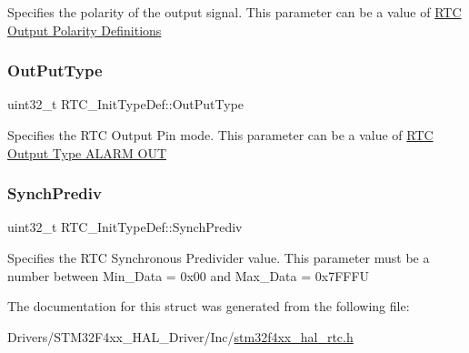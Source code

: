 Specifies the polarity of the output signal. This parameter can be a value of \hyperlink{group___r_t_c___output___polarity___definitions}{R\+TC Output Polarity Definitions} \mbox{\label{struct_r_t_c___init_type_def_a2c4a2bd3cfae39882e657e653e45185a}} 
\subsubsection{\texorpdfstring{Out\+Put\+Type}{OutPutType}}
{\footnotesize\ttfamily uint32\+\_\+t R\+T\+C\+\_\+\+Init\+Type\+Def\+::\+Out\+Put\+Type}

Specifies the R\+TC Output Pin mode. This parameter can be a value of \hyperlink{group___r_t_c___output___type___a_l_a_r_m___o_u_t}{R\+TC Output Type A\+L\+A\+RM O\+UT} \mbox{\label{struct_r_t_c___init_type_def_ac27c42530b6ba86654ec476cd0d020fb}} 
\subsubsection{\texorpdfstring{Synch\+Prediv}{SynchPrediv}}
{\footnotesize\ttfamily uint32\+\_\+t R\+T\+C\+\_\+\+Init\+Type\+Def\+::\+Synch\+Prediv}

Specifies the R\+TC Synchronous Predivider value. This parameter must be a number between Min\+\_\+\+Data = 0x00 and Max\+\_\+\+Data = 0x7\+F\+F\+FU 

The documentation for this struct was generated from the following file\+:\begin{DoxyCompactItemize}
\item 
Drivers/\+S\+T\+M32\+F4xx\+\_\+\+H\+A\+L\+\_\+\+Driver/\+Inc/\hyperlink{stm32f4xx__hal__rtc_8h}{stm32f4xx\+\_\+hal\+\_\+rtc.\+h}\end{DoxyCompactItemize}
